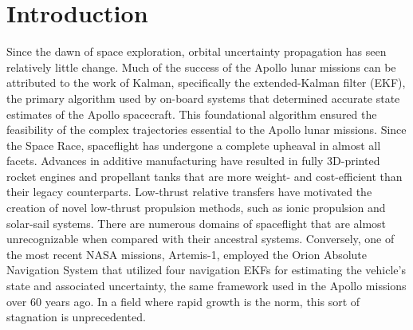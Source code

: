 \documentclass[paper,11pt]{AAS}
\begin{document}

\section{Introduction}

Since the dawn of space exploration, orbital uncertainty propagation has seen relatively little change. Much of the success of the Apollo lunar missions can be attributed to the work of Kalman, specifically the extended-Kalman filter\cite{kalman} (EKF), the primary algorithm used by on-board systems that determined accurate state estimates of the Apollo spacecraft\cite{sF81}. This foundational algorithm ensured the feasibility of the complex trajectories essential to the Apollo lunar missions. Since the Space Race, spaceflight has undergone a complete upheaval in almost all facets. Advances in additive manufacturing have resulted in fully 3D-printed rocket engines and propellant tanks that are more weight- and cost-efficient than their legacy counterparts\cite{eS22, rC14}. Low-thrust relative transfers have motivated the creation of novel low-thrust propulsion methods, such as ionic propulsion\cite{jB03} and solar-sail systems\cite{yT13}. There are numerous domains of spaceflight that are almost unrecognizable when compared with their ancestral systems. Conversely, one of the most recent NASA missions, Artemis-1, employed the Orion Absolute Navigation System that utilized four navigation EKFs for estimating the vehicle's state and associated uncertainty\cite{jS23}, the same framework used in the Apollo missions over 60 years ago. In a field where rapid growth is the norm, this sort of stagnation is unprecedented. 
\end{document}
